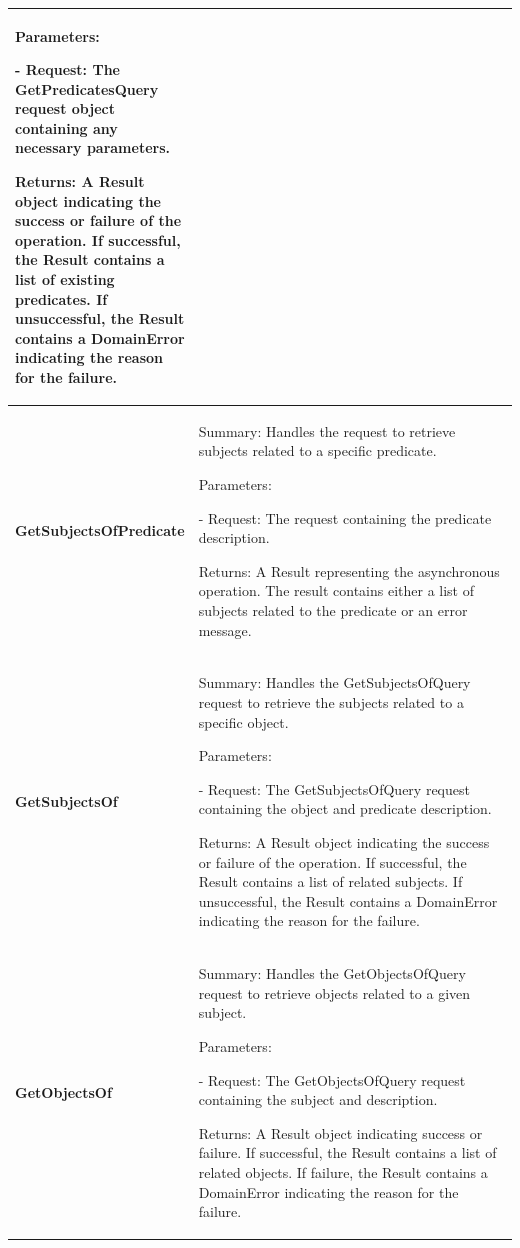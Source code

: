 \begin{longtable}
\begin{tabular}{|p{0.25\linewidth}|p{0.75\linewidth}|}
Parameters:

- Request: The GetPredicatesQuery request object containing any necessary parameters.

Returns: A Result object indicating the success or failure of the operation. If successful, the Result contains a list of existing predicates. If unsuccessful, the Result contains a DomainError indicating the reason for the failure.
\\
\hline
    \textbf{GetSubjectsOfPredicate} & Summary: Handles the request to retrieve subjects related to a specific predicate.
    
Parameters:

- Request: The request containing the predicate description.

Returns: A Result representing the asynchronous operation. The result contains either a list of subjects related to the predicate or an error message.
\\
\hline
    \textbf{GetSubjectsOf} & Summary: Handles the GetSubjectsOfQuery request to retrieve the subjects related to a specific object.
    
Parameters:

- Request: The GetSubjectsOfQuery request containing the object and predicate description.

Returns: A Result object indicating the success or failure of the operation. 	If successful, the Result contains a list of related subjects. If unsuccessful, the Result contains a DomainError indicating the reason for the failure.
\\
\hline
    \textbf{GetObjectsOf} & Summary: Handles the GetObjectsOfQuery request to retrieve objects related to a given subject.
    
Parameters:

- Request: The GetObjectsOfQuery request containing the subject and description.

Returns: A Result object indicating success or failure. If successful, the Result contains a list of related objects. If failure, the Result contains a DomainError indicating the reason for the failure.
\\
        \hline
    \end{tabular}
\end{longtable}        



